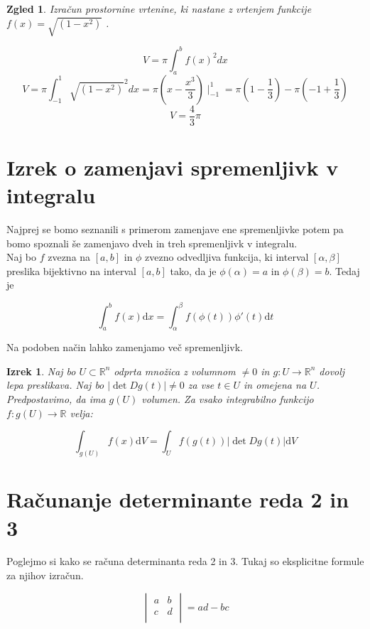 \documentclass[12pt, a4paper]{article}
\newtheorem{izrek}{Izrek}
\newtheorem{zgled}{Zgled}
\begin{document}
\begin{zgled} 
Izračun prostornine vrtenine, ki nastane z vrtenjem funkcije $f(x)=\sqrt{(1-x^2)}$ .

$$V=\pi \int_{a}^b{f(x)}^2dx$$
$$V=\pi \int_{-1}^1{{\sqrt{(1-x^2)}}}^2dx=\pi(x-\frac{x^3}{3})\mid_{-1}^1= \pi (1-\frac{1}{3})-\pi (-1+\frac{1}{3})$$
$$V=\frac{4}{3}\pi$$
\end{zgled}


\section{Izrek o zamenjavi spremenljivk v integralu}
Najprej se bomo seznanili s primerom zamenjave ene spremenljivke potem pa bomo spoznali še zamenjavo dveh in treh spremenljivk v integralu.
\\
Naj bo $f$ zvezna na $[a,b]$ in $\phi$ zvezno odvedljiva funkcija, ki interval $[\alpha,\beta]$ preslika bijektivno na interval $[a,b]$ tako, da je  $\phi(\alpha)=a$ in $\phi(\beta)=b$. Tedaj je

$$\int_{a}^bf(x)\mathrm{d} x=\int_{\alpha}^{\beta}f(\phi(t))\phi'(t)\mathrm{d} t$$

Na podoben način lahko zamenjamo več spremenljivk. 
\begin{izrek}
Naj bo $U \subset \mathbb{R}^n$ odprta množica z volumnom $\neq 0$ in $g:U \rightarrow \mathbb{R}^n$ dovolj lepa preslikava. Naj bo $\big | \det Dg(t) \big |\neq 0$ za vse $t \in U$ in omejena na $U$. Predpostavimo, da ima $g(U)$ volumen. Za vsako integrabilno funkcijo $f:g(U) \rightarrow \mathbb{R}$ velja:

$$\int_{g(U)}^{}f(x) \mathrm{d} V=\int_{U}^{}f(g(t)) \big |\det Dg(t) \big | \mathrm{d} V$$
\end{izrek}

\section{Računanje determinante reda 2 in 3}

Poglejmo si kako se računa determinanta reda 2 in 3. Tukaj so eksplicitne formule za njihov izračun.

\[
\begin{vmatrix}
    a& b  \\
   c &d \\
\end{vmatrix}
=ad-bc
\]
\end{document}
